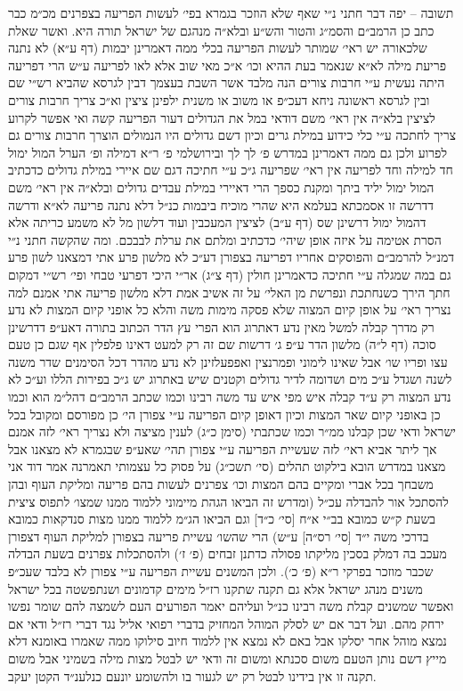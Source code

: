 \documentclass[12pt, openany]{book}
\begin{document}
\begin{multicols}{2}
תשובה – יפה דבר חתני נ״י שאף שלא הוזכר בגמרא בפי׳ לעשות הפריעה בצפרנים מכ״מ כבר כתב כן הרמב״ם והסמ״ג והטור והש״ע ובלא״ה מנהגם של ישראל תורה היא. ואשר שאלת שלכאורה יש ראי׳ שמותר לעשות הפריעה בכלי ממה דאמרינן יבמות (דף ע״א) לא נתנה פריעת מילה לא״א שנאמר בעת ההיא וכו׳ א״כ מאי שוב אלא לאו לפריעה ע״ש הרי דפריעה היתה נעשית ע״י חרבות צורים הנה מלבד אשר השבת בעצמך דבין לגרסא שהביא רש״י שם ובין לגרסא ראשונה ניחא דעכ״פ או משוב או משנית ילפינן ציצין וא״כ צריך חרבות צורים לציצין בלא״ה אין ראי׳ משם דודאי במל את הגדולים דעור הפריעה קשה ואי אפשר לקרוע צריך לחתכה ע״י כלי כידוע במילת גרים וכיון דשם גדולים היו הנמולים הוצרך חרבות צורים גם לפרוע ולכן גם ממה דאמרינן במדרש פ׳ לך לך ובירושלמי פ׳ ר״א דמילה ופ׳ הערל המול ימול חד למילה וחד לפריעה אין ראי׳ שפריעה ג״כ ע״י חתיכה דגם שם איירי במילת גדולים כדכתיב המול ימול יליד ביתך ומקנת כספך הרי דאיירי במילת עבדים גדולים ובלא״ה אין ראי׳ משם דדרשה זו אסמכתא בעלמא היא שהרי מוכיח ביבמות כנ״ל דלא נתנה פריעה לא״א ודרשה דהמול ימול דרשינן שס (דף ע״ב) לציצין המעכבין ועוד דלשון מל לא משמע כריתה אלא הסרת אטימה על איזה אופן שיהי׳ כדכתיב ומלתם את ערלת לבבכם. ומה שהקשה חתני נ״י דמנ״ל להרמב״ם והפוסקים אחריו דפריעה בצפורן דע״כ לא מלשון פרע אתי דמצאנו לשון פרע גם במה שמגלה ע״י חתיכה כדאמרינן חולין (דף צ״ג) אר״י היכי דפרעי טבחי ופי׳ רש״י דמקום חתך הירך כשנחתכת ונפרשת מן האלי׳ על זה אשיב אמת דלא מלשון פריעה אתי אמנם למה נצריך ראי׳ על אופן קיום המצוה שלא פסקה מימות משה והלא כל אופני קיום המצות לא נדע רק מדרך קבלה למשל מאין נדע דאתרוג הוא הפרי עץ הדר הכתוב בתורה דאע״פ דדרשינן סוכה (דף ל״ה) מלשון הדר ע״פ ג׳ דרשות שם זה רק למעט דאינו פלפלין אף שגם כן טעם עצו ופריו שו׳ אבל שאינו לימוני ופמרנצין ואפפעלזינן לא נדע מהדר דכל הסימנים שדר משנה לשנה ושגדל ע״כ מים ושדומה לדיר גדולים וקטנים שיש באתרוג יש ג״כ בפירות הללו וע״כ לא נדע המצוה רק ע״ד קבלה איש מפי איש עד משה רבינו וכמו שכתב הרמב״ם דהל״מ הוא וכמו כן באופני קיום שאר המצות וכיון דאופן קיום הפריעה ע״י צפורן הי׳ כן מפורסם ומקובל בכל ישראל ודאי שכן קבלנו ממ״ר וכמו שכתבתי (סימן כ״ג) לענין מציצה ולא נצריך ראי׳ לזה אמנם אך ליתר אביא ראי׳ לזה שעשיית הפריעה ע״י צפורן תהי׳ שאע״פ שבגמרא לא מצאנו אבל מצאנו במדרש הובא בילקוט תהלים (סי׳ תשכ״ג) על פסוק כל עצמותי תאמרנה אמר דוד אני משבחך בכל אברי ומקיים בהם המצות וכו׳ צפרנים לעשות בהם פריעה ומליקת העוף ובהן להסתכל אור להבדלה עכ״ל (ומדרש זה הביאו הגהת מיימוני ללמוד ממנו שמצו׳ לתפוס ציצית בשעת ק״ש כמובא בב״י א״ח [סי׳ כ״ד] וגם הביאו הג״מ ללמוד ממנו מצות סנדקאות כמובא בדרכי משה י״ד [סי׳ רס״ה] ע״ש) הרי שהשו׳ עשיית פריעה בצפורן למליקת העוף דצפורן מעכב בה דמלק בסכין מליקתו פסולה כדתנן זבחים (פ׳ ז׳) ולהסתכלות צפרנים בשעת הבדלה שכבר מוזכר בפרקי ר״א (פ׳ כ׳). ולכן המשנים עשיית הפריעה ע״י צפורן לא בלבד שעכ״פ משנים מנהג ישראל אלא גם תקנה שתקנו רז״ל מימים קדמונים ושנתפשטה בכל ישראל ואפשר שמשנים קבלת משה רבינו כנ״ל ועליהם יאמר הפורעים העם לשמצה להם שומר נפשו ירחק מהם. ועל דבר אם יש לסלק המוהל המחזיק בדברי רפואי אליל נגד דברי רז״ל ודאי אם נמצא מוהל אחר יסלקו אבל באם לא נמצא אין ללמוד חיוב סילוקו ממה שאמרו באומנא דלא מייץ דשם נותן הטעם משום סכנתא ומשום זה ודאי יש לבטל מצות מילה בשמיני אבל משום תקנה זו אין בידינו לבטל רק יש לגעור בו ולהשומע יונעם כנלענ״ד הקטן יעקב.\\\vspace{0pt}

\end{multicols}\newpage
\end{document}

